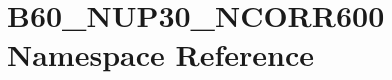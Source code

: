 \hypertarget{namespace_b60___n_u_p30___n_c_o_r_r600}{}\section{B60\+\_\+\+N\+U\+P30\+\_\+\+N\+C\+O\+R\+R600 Namespace Reference}
\label{namespace_b60___n_u_p30___n_c_o_r_r600}
